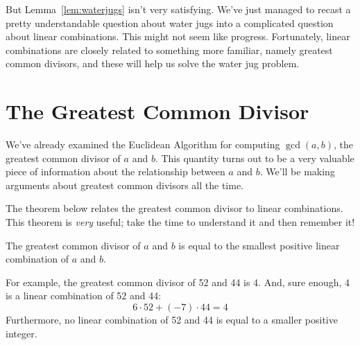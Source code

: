But Lemma~\ref{lem:waterjugs} isn't very satisfying.  We've just
managed to recast a pretty understandable question about water jugs
into a complicated question about linear combinations.  This might not
seem like progress.  Fortunately, linear combinations are closely
related to something more familiar, namely greatest common divisors,
and these will help us solve the water jug problem.



\section{The Greatest Common Divisor}
\label{sec:gcd}

We've already examined the Euclidean Algorithm for computing $\gcd(a, b)$,
the greatest common divisor of $a$ and $b$.  This quantity turns out to be
a very valuable piece of information about the relationship between $a$
and $b$.  We'll be making arguments about greatest common divisors all
the time.


The theorem below relates the greatest common divisor to linear
combinations.  This theorem is \emph{very} useful; take the time to
understand it and then remember it!

\begin{theorem}
\label{th:gcd}
The greatest common divisor of $a$ and $b$ is equal to the smallest
positive linear combination of $a$ and $b$.
\end{theorem}

For example, the greatest common divisor of 52 and 44 is 4.  And, sure
enough, 4 is a linear combination of 52 and 44:
%
\[
6 \cdot 52 + (-7) \cdot 44  =  4
\]
%
Furthermore, no linear combination of 52 and 44 is equal to a smaller
positive integer.

